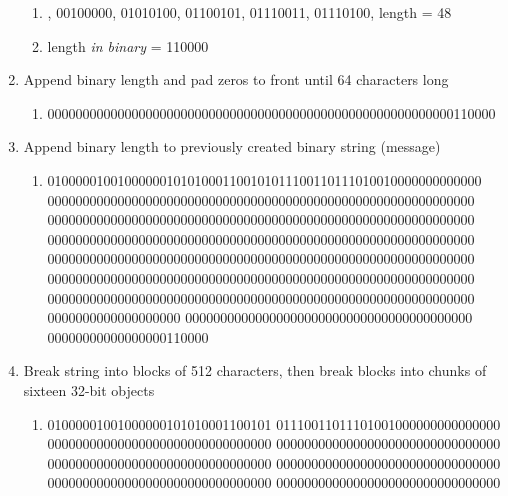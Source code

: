 \documentclass[12pt]{extarticle}
\begin{document}
\begin{enumerate}
     \begin{enumerate}
        \item {}, 00100000, 01010100, 01100101, 01110011, 01110100\rbrack , length = 48
        \item length {\slshape{in binary}} = 110000
    \end{enumerate}
  \item Append binary length and pad zeros to front until 64 characters long
    \begin{enumerate}
        \item 0000000000000000000000000000000000000000000000000000000000110000
    \end{enumerate}
  \item Append binary length to previously created binary string (message)
     \begin{enumerate}
        \item 01000001001000000101010001100101011100110111010010000000000000\\
        0000000000000000000000000000000000000000000000000000000000000\\
        0000000000000000000000000000000000000000000000000000000000000\\
        0000000000000000000000000000000000000000000000000000000000000\\
        0000000000000000000000000000000000000000000000000000000000000\\
        0000000000000000000000000000000000000000000000000000000000000\\
        0000000000000000000000000000000000000000000000000000000000000\\
        0000000000000000000 00000000000000000000000000000000000000000\\
        00000000000000000110000
    \end{enumerate}
  \item Break string into blocks of 512 characters, then break blocks into chunks of sixteen 32-bit objects
      \begin{enumerate}
        \item   01000001001000000101010001100101 01110011011101001000000000000000\\ 00000000000000000000000000000000 00000000000000000000000000000000\\
        00000000000000000000000000000000 00000000000000000000000000000000\\
        00000000000000000000000000000000 00000000000000000000000000000000\\

\end{enumerate}
\end{enumerate}
\end{document}
